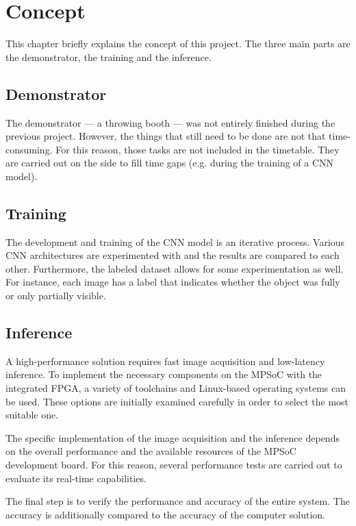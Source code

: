 \chapter{Concept}
\label{ch:concept}

This chapter briefly explains the concept of this project.
The three main parts are the demonstrator, the training and the inference.

\section{Demonstrator}
\label{sec:demonstrator}

The demonstrator --- a throwing booth --- was not entirely finished during the previous project.
However, the things that still need to be done are not that time-consuming.
For this reason, those tasks are not included in the timetable.
They are carried out on the side to fill time gaps (e.g. during the training of a CNN model).

\section{Training}
\label{sec:training}

The development and training of the CNN model is an iterative process.
Various CNN architectures are experimented with and the results are compared to each other.
Furthermore, the labeled dataset allows for some experimentation as well.
For instance, each image has a label that indicates whether the object was fully or only partially visible.

\section{Inference}
\label{sec:inference}

A high-performance solution requires fast image acquisition and low-latency inference.
To implement the necessary components on the MPSoC with the integrated FPGA, a variety of toolchains and Linux-based operating systems can be used.
These options are initially examined carefully in order to select the most suitable one.

The specific implementation of the image acquisition and the inference depends on the overall performance and the available resources of the MPSoC development board.
For this reason, several performance tests are carried out to evaluate its real-time capabilities.

The final step is to verify the performance and accuracy of the entire system.
The accuracy is additionally compared to the accuracy of the computer solution.
